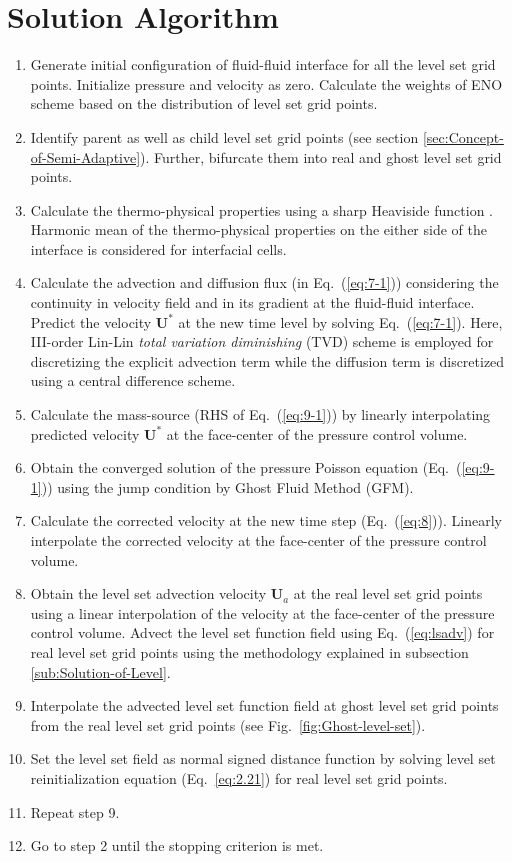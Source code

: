 \documentclass[preprint,12pt]{elsarticle}
\begin{document}
\section{Solution Algorithm }
\begin{enumerate}
\item Generate initial configuration of fluid-fluid interface for all the
level set grid points. Initialize pressure and velocity as zero. Calculate
the weights of ENO scheme based on the distribution of level set grid
points.
\item Identify parent as well as child level set grid points (see section
\ref{sec:Concept-of-Semi-Adaptive}). Further, bifurcate them into
real and ghost level set grid points.
\item Calculate the thermo-physical properties using a sharp Heaviside function
\cite{shaikh2018}. Harmonic mean of the thermo-physical properties on
the either side of the interface is considered for interfacial cells.
\item Calculate the advection and diffusion flux (in Eq.~(\ref{eq:7-1}))
considering the continuity in velocity field and in its gradient at
the fluid-fluid interface. Predict the velocity $\mathbf{U^{*}}$
at the new time level by solving Eq.~(\ref{eq:7-1}). Here, III-order
Lin-Lin \textit{total variation diminishing} (TVD) \cite{date2005} scheme
is employed for discretizing the explicit advection term while the
diffusion term is discretized using a central difference scheme.
\item Calculate the mass-source (RHS of Eq.~(\ref{eq:9-1})) by linearly
interpolating predicted velocity $\mathbf{U^{*}}$ at the face-center
of the pressure control volume.
\item Obtain the converged solution of the pressure Poisson equation (Eq.~(\ref{eq:9-1})) using the jump condition by Ghost Fluid Method
(GFM).
\item Calculate the corrected velocity at the new time step (Eq.~(\ref{eq:8})).
Linearly interpolate the corrected velocity at the face-center of
the pressure control volume.
\item Obtain the level set advection velocity $\mathbf{U}_{a}$ at the real
level set grid points using a linear interpolation of the velocity
at the face-center of the pressure control volume. Advect the level
set function field using Eq.~(\ref{eq:lsadv}) for real level set
grid points using the methodology explained in subsection \ref{sub:Solution-of-Level}.
\item Interpolate the advected level set function field at ghost level set
grid points from the real level set grid points (see Fig.~\ref{fig:Ghost-level-set}).
\item Set the level set field as normal signed distance function by solving
level set reinitialization equation (Eq.~\ref{eq:2.21}) for real
level set grid points.
\item Repeat step 9.
\item Go to step 2 until the stopping criterion is met.
\end{enumerate}
\end{document}
